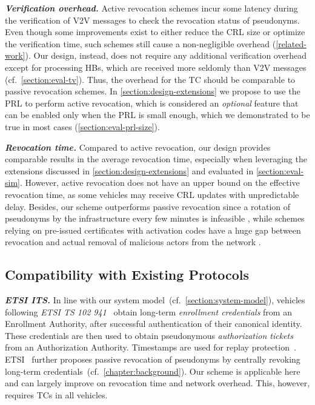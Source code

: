 \noindent\textbf{\emph{Verification overhead.}}
%
Active revocation schemes incur some latency during the verification of \ac{V2V}
messages to check the revocation status of pseudonyms. Even though some
improvements exist to either reduce the \ac{CRL} size or optimize the
verification time, such schemes still cause a non-negligible overhead
(\cref{related-work}). Our design, instead, does not require any additional
verification overhead except for processing \acp{HB}, which are received more
seldomly than \ac{V2V} messages (cf.~\cref{section:eval-tv}). Thus, the overhead
for the \ac{TC} should be comparable to passive revocation schemes. %
In
\cref{section:design-extensions} we propose to use the \ac{PRL} to perform
active revocation, which is considered an \emph{optional} feature that can be
enabled only when the \ac{PRL} is small enough, which we demonstrated to be true
in most cases (\cref{section:eval-prl-size}).

\noindent\textbf{\emph{Revocation time.}}
%
Compared to active revocation, our design provides comparable results in the
average revocation time, especially when leveraging the extensions discussed in
\cref{section:design-extensions} and evaluated in \cref{section:eval-sim}.
However, active revocation does not have an upper bound on the effective
revocation time, as some vehicles may receive \ac{CRL} updates with
unpredictable delay. Besides, our scheme outperforms passive revocation since a
rotation of pseudonyms by the infrastructure every few minutes is infeasible
\cite{hicks2020vehicular}, while schemes relying on pre-issued certificates with
activation codes have a huge gap between revocation and actual removal of
malicious actors from the network \cite{verheul2019ifal,simplicio2019acpc}.

\subsection{Compatibility with Existing Protocols}
\label{section:discussion-compatibility}

\noindent\textbf{\emph{ETSI ITS.}}
%
In line with our system model~(cf.~\cref{section:system-model}), vehicles
following \emph{ETSI TS 102 941}~\cite{etsi2022102941} obtain long-term
\emph{enrollment credentials} from an Enrollment Authority, after successful
authentication of their canonical identity. These credentials are then used to
obtain pseudonymous \emph{authorization tickets} from an Authorization
Authority. Timestamps are used for replay protection~\cite{etsi2021102940}.
ETSI~\cite{etsi2022102941} further proposes passive revocation of pseudonyms by
centrally revoking long-term credentials~(cf.~\cref{chapter:background}). Our
scheme is applicable here and can largely improve on revocation time and network
overhead. This, however, requires \acp{TC} in all vehicles.

